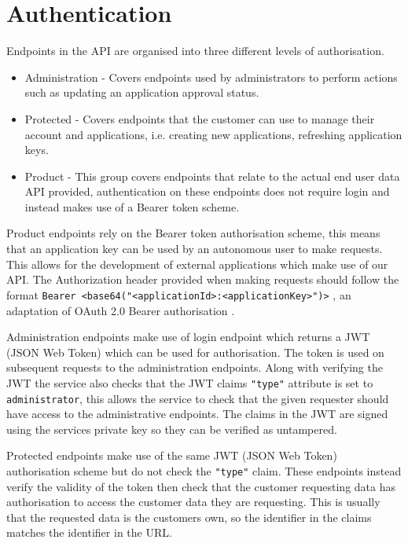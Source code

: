 \documentclass[10pt,a4paper]{article}
\begin{document}
\section{Authentication}

Endpoints in the API are organised into three different levels of authorisation.

\begin{itemize}
  \item Administration - Covers endpoints used by administrators to perform actions such as updating an application approval status.
  \item Protected - Covers endpoints that the customer can use to manage their account and applications, i.e. creating new applications, refreshing application keys.
  \item Product - This group covers endpoints that relate to the actual end user data API provided, authentication on these endpoints does not require login and instead makes use of a Bearer token scheme.
\end{itemize}

\noindent
Product endpoints rely on the Bearer token authorisation scheme, this means that an application key can be used by an autonomous user to make requests. This allows for the development of external applications which make use of our API. The Authorization header provided when making requests should follow the format \texttt{Bearer <base64("<applicationId>:<applicationKey>")>} \citep{bearer}, an adaptation of OAuth 2.0 Bearer authorisation \citep{rfc6750}.

\noindent
\newline
Administration endpoints make use of login endpoint which returns a JWT (JSON Web Token) \citep{rfc7519} which can be used for authorisation. The token is used on subsequent requests to the administration endpoints. Along with verifying the JWT the service also checks that the JWT claims \texttt{"type"} attribute is set to \texttt{administrator}, this allows the service to check that the given requester should have access to the administrative endpoints. The claims in the JWT are signed using the services private key so they can be verified as untampered.

\noindent
\newline
Protected endpoints make use of the same JWT (JSON Web Token) authorisation scheme but do not check the \texttt{"type"} claim. These endpoints instead verify the validity of the token then check that the customer requesting data has authorisation to access the customer data they are requesting. This is usually that the requested data is the customers own, so the identifier in the claims matches the identifier in the URL.
\end{document}
